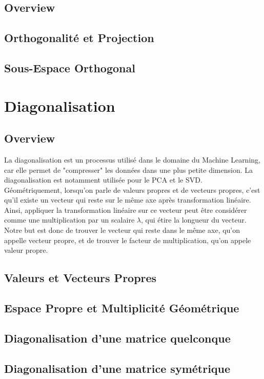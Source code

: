 \documentclass{article}
\begin{document}
\subsection{Overview}

\subsection{Orthogonalité et Projection}
\subsection{Sous-Espace Orthogonal}

\pagebreak

\section{Diagonalisation}
\subsection{Overview}

La diagonalisation est un processus utilisé dans le domaine du Machine Learning,
car elle permet de "compresser" les données dans une plus petite dimension. La
diagonalisation est notamment utilisée pour le PCA et le SVD.\\

Géométriquement, lorsqu'on parle de valeurs propres et de vecteurs propres, c'est
qu'il existe un vecteur qui reste sur le même axe après transformation linéaire.
Ainsi, appliquer la transformation linéaire sur ce vecteur peut être considérer
comme une multiplication par un scalaire $\lambda$, qui étire la longueur du vecteur.
Notre but est donc de trouver le vecteur qui reste dans le même axe, qu'on appelle
vecteur propre, et de trouver le facteur de multiplication, qu'on appele valeur
propre.

\subsection{Valeurs et Vecteurs Propres}
\subsection{Espace Propre et Multiplicité Géométrique}
\subsection{Diagonalisation d'une matrice quelconque}
\subsection{Diagonalisation d'une matrice symétrique}

\pagebreak
\end{document}
